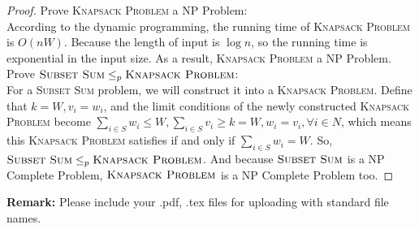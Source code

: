 \documentclass[12pt,a4paper]{article}
\theoremstyle{definition}
\begin{document}
\begin{enumerate}
    \begin{proof}
        Prove \textsc{Knapsack Problem} a NP Problem:\\
        According to the dynamic programming, the running time of \textsc{Knapsack Problem} is $O(nW)$. Because the length of input is $\log n$, so the running time is exponential in the input size. As a result, \textsc{Knapsack Problem} a NP Problem.\\
        Prove $\textsc{Subset Sum}\leq_p\textsc{Knapsack Problem}$:\\
        For a \textsc{Subset Sum} problem, we will construct it into a \textsc{Knapsack Problem}. Define that $k=W,v_i=w_i$, and the limit conditions of the newly constructed \textsc{Knapsack Problem} become $\sum_{i \in S}w_i \leq W,\sum_{i \in S}v_i \geq k = W, w_i = v_i, \forall i \in N$, which means this \textsc{Knapsack Problem} satisfies if and only if $\sum_{i \in S}w_i = W$. So, $\textsc{Subset Sum}\leq_p\textsc{Knapsack Problem}$.
        And because $\textsc{Subset Sum}$ is a NP Complete Problem, $\textsc{Knapsack Problem}$ is a NP Complete Problem too.
    \end{proof}
    
\end{enumerate}


\textbf{Remark:} Please include your .pdf, .tex files for uploading with standard file names.
\newpage


\end{document}
